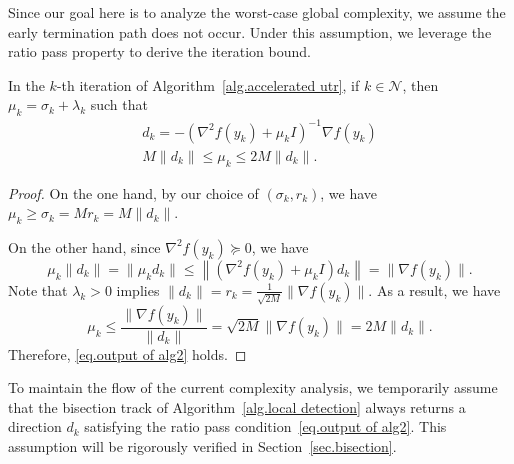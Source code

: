 \documentclass{mcom-l}
\numberwithin{equation}{section}
\begin{document}
Since our goal here is to analyze the worst-case global complexity, we assume the early termination path does not occur. Under this assumption, we leverage the ratio pass property to derive the iteration bound.
\begin{lemma}
    \label{lem.ratio pass nonzero}
    In the $k$-th iteration of Algorithm~\ref{alg.accelerated utr}, if $k\in\mathcal{N}$, then $\mu_k=\sigma_k+\lambda_k$ such that
    \begin{subequations}
        \label{eq.output of alg2}
        \begin{gather}
            d_k = -\left(\nabla^2 f(y_k)+\mu_k I \right)^{-1}\nabla f(y_k)\\
            M\|d_k\|\leq \mu_k \leq 2M\|d_k\|.
        \end{gather}
    \end{subequations}
\end{lemma}
\begin{proof}
    On the one hand, by our choice of $(\sigma_k,r_k)$, we have $\mu_k\geq\sigma_k= Mr_k= M\|d_k\|$.

    On the other hand, since $\nabla^2 f(y_k)\succeq 0$, we have
    \begin{equation*}
        \mu_k\|d_k\|=\|\mu_kd_k\|\leq \left\|\left(\nabla^2 f(y_k)+\mu_k I\right)d_k\right\|=\|\nabla f(y_k)\|.
    \end{equation*}
    Note that $\lambda_k>0$ implies $\|d_k\|=r_k=\frac{1}{\sqrt{2M}}\|\nabla f(y_k)\|$. As a result, we have
    \begin{equation*}
        \mu_k\leq \frac{\|\nabla f(y_k)\|}{\|d_k\|}=\sqrt{2M}\|\nabla f(y_k)\|=2M\|d_k\|.
    \end{equation*}
    Therefore, \eqref{eq.output of alg2} holds.
\end{proof}
To maintain the flow of the current complexity analysis, we temporarily assume that the bisection track of Algorithm~\ref{alg.local detection} always returns a direction $d_k$ satisfying the ratio pass condition~\eqref{eq.output of alg2}. This assumption will be rigorously verified in Section~\ref{sec.bisection}.
\end{document}
